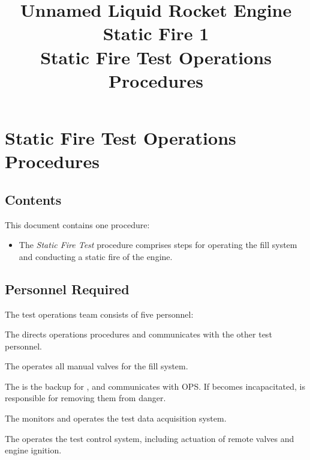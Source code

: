 

\title{
\Huge Unnamed Liquid Rocket Engine\\
Static Fire 1\\
\vspace{1cm}
\Large Static Fire Test Operations Procedures}





\section{Static Fire Test Operations Procedures}

\subsection{Contents}
This document contains one procedure:
\begin{itemize}
    \item The \textit{Static Fire Test} procedure comprises steps for operating the fill system and conducting a static fire of the engine.
\end{itemize}

\subsection{Personnel Required}
The test operations team consists of five personnel:
\begin{checklist}
    \item The \opsfull{} directs operations procedures and communicates with the other test personnel.
    \item The \primaryfull{} operates all manual valves for the fill system.
    \item The \secondaryfull{} is the backup for \primary{}, and communicates with OPS. If \primary{} becomes incapacitated, \secondary{} is responsible for removing them from danger.
    \item The \daqfull{} monitors and operates the test data acquisition system.
    \item The \controlfull{} operates the test control system, including actuation of remote valves and engine ignition.
\end{checklist}
\setcounter{checklistnum}{0}

